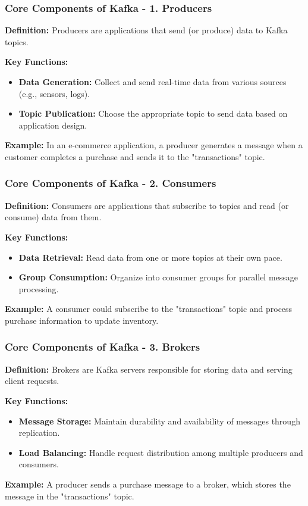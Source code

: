 \documentclass[aspectratio=169]{beamer}
\begin{document}
\begin{frame}[fragile]
    \frametitle{Core Components of Kafka - 1. Producers}
    \textbf{Definition:} Producers are applications that send (or produce) data to Kafka topics.

    \textbf{Key Functions:}
    \begin{itemize}
        \item \textbf{Data Generation:} Collect and send real-time data from various sources (e.g., sensors, logs).
        \item \textbf{Topic Publication:} Choose the appropriate topic to send data based on application design.
    \end{itemize}

    \textbf{Example:} In an e-commerce application, a producer generates a message when a customer completes a purchase and sends it to the "transactions" topic.
\end{frame}

\begin{frame}[fragile]
    \frametitle{Core Components of Kafka - 2. Consumers}
    \textbf{Definition:} Consumers are applications that subscribe to topics and read (or consume) data from them.

    \textbf{Key Functions:}
    \begin{itemize}
        \item \textbf{Data Retrieval:} Read data from one or more topics at their own pace.
        \item \textbf{Group Consumption:} Organize into consumer groups for parallel message processing.
    \end{itemize}

    \textbf{Example:} A consumer could subscribe to the "transactions" topic and process purchase information to update inventory.
\end{frame}

\begin{frame}[fragile]
    \frametitle{Core Components of Kafka - 3. Brokers}
    \textbf{Definition:} Brokers are Kafka servers responsible for storing data and serving client requests.

    \textbf{Key Functions:}
    \begin{itemize}
        \item \textbf{Message Storage:} Maintain durability and availability of messages through replication.
        \item \textbf{Load Balancing:} Handle request distribution among multiple producers and consumers.
    \end{itemize}

    \textbf{Example:} A producer sends a purchase message to a broker, which stores the message in the "transactions" topic.
\end{frame}
\end{document}
